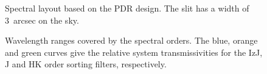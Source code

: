 \documentclass[a4paper,twoside,11pt]{article}
\begin{document}
\begin{figure}[hb]
  \caption{Spectral layout based on the PDR design. The slit has a
    width of 3~arcsec on the sky.}
  \label{fig:spectral_layout}
\end{figure}

\begin{figure}[ht]
  \centering
  \caption{Wavelength ranges covered by the spectral orders. The blue,
    orange and green curves give the relative system transmissivities
    for the IzJ, J and HK order sorting filters, respectively.}
  \label{fig:spectral_orders_wavelength}
\end{figure}

\end{document}
